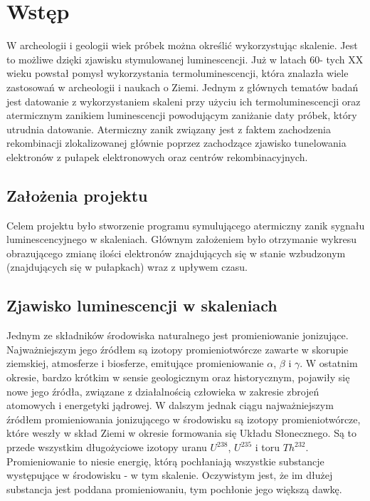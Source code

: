 \chapter{Wstęp}
W archeologii i geologii wiek próbek można określić wykorzystując skalenie. Jest to możliwe dzięki zjawisku stymulowanej luminescencji. Już w latach 60- tych  XX wieku powstał pomysł wykorzystania termoluminescencji, która znalazła wiele zastosowań w archeologii i naukach o Ziemi. Jednym z głównych tematów badań jest datowanie z wykorzystaniem skaleni przy użyciu ich termoluminescencji oraz atermicznym zanikiem luminescencji powodującym zaniżanie daty próbek, który utrudnia datowanie. Atermiczny zanik związany jest z faktem zachodzenia rekombinacji zlokalizowanej głównie poprzez zachodzące zjawisko tunelowania elektronów z pułapek elektronowych oraz centrów rekombinacyjnych. 

\section{Założenia projektu}
Celem projektu było stworzenie programu symulującego atermiczny zanik sygnału luminescencyjnego w skaleniach. Głównym założeniem było otrzymanie wykresu obrazującego zmianę ilości elektronów znajdujących się w stanie wzbudzonym (znajdujących się w pułapkach) wraz z upływem czasu.

\section{Zjawisko luminescencji w skaleniach}


Jednym ze składników środowiska naturalnego jest promieniowanie jonizujące. Najważniejszym jego źródłem są izotopy promieniotwórcze zawarte w skorupie ziemskiej, atmosferze
i biosferze, emitujące promieniowanie $\alpha$, $\beta$ i $\gamma$. 
W ostatnim okresie, bardzo krótkim w sensie geologicznym oraz historycznym, pojawiły
się nowe jego źródła, związane z działalnością człowieka w zakresie zbrojeń atomowych
i energetyki jądrowej. W dalszym jednak ciągu najważniejszym źródłem promieniowania
jonizującego w środowisku są izotopy promieniotwórcze, które weszły w skład Ziemi w okresie
formowania się Układu Słonecznego.  Są to przede wszystkim długożyciowe izotopy uranu $U^{238}$, $U^{235}$ i toru $Th^{232}$. Promieniowanie to niesie energię, którą pochłaniają wszystkie substancje występujące
w środowisku - w tym skalenie. Oczywistym jest, że im dłużej substancja  jest poddana promieniowaniu, tym pochłonie jego większą dawkę.

